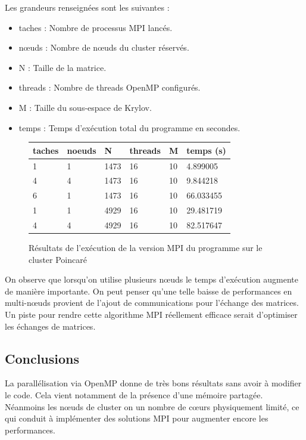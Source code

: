 \documentclass[11pt,a4paper]{article}
\begin{document}
			\medskip
		
			Les grandeurs renseignées sont les suivantes :
			\begin{itemize}
				\item taches : Nombre de processus MPI lancés.
				\item n\oe{}uds : Nombre de n\oe{}uds du cluster réservés.
				\item N : Taille de la matrice.
				\item threads : Nombre de threads OpenMP configurés.
				\item M : Taille du sous-espace de Krylov.
				\item temps : Temps d'exécution total du programme en secondes.
			\end{itemize}

			\begin{figure}
				\begin{center}
					\begin{tabular}{l l l l l l}
						taches	& noeuds & N & threads & M & temps (s)\\ \hline
						1 		& 1 & 1473 & 16 & 10 & 4.899005\\
						4 		& 4 & 1473 & 16 & 10 & 9.844218\\
						6 		& 1 & 1473 & 16 & 10 & 66.033455\\ \hline
						1 & 1 & 4929 & 16 & 10 & 29.481719\\
						4 & 4 & 4929 & 16 & 10 & 82.517647\\
					\end{tabular}
				\end{center}
				\caption{Résultats de l'exécution de la version MPI du programme sur le cluster Poincaré}
				\label{res-mpi}
			\end{figure}

			\bigskip

			On observe que lorsqu'on utilise plusieurs n\oe{}uds le temps d'exécution augmente de manière importante. On peut penser qu'une telle baisse de performances en multi-n\oe{}uds provient de l'ajout de communications pour l'échange des matrices. Un piste pour rendre cette algorithme MPI réellement efficace serait d'optimiser les échanges de matrices.

	\subsection{Conclusions}

	La parallélisation via OpenMP donne de très bons résultats sans avoir à modifier le code. Cela vient notamment de la présence d'une mémoire partagée. Néanmoins les n\oe{}uds de cluster on un nombre de c\oe{}urs physiquement limité, ce qui conduit à implémenter des solutions MPI pour augmenter encore les performances.
\end{document}
